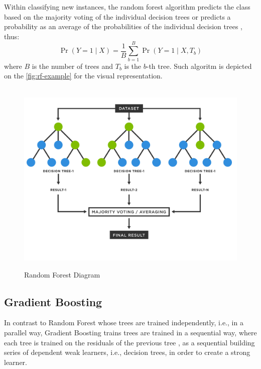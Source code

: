Within classifying new instances, the random forest algorithm predicts the class based on the majority voting of the individual decision trees or predicts a probability as an average of the probabilities of the individual decision trees \citep{randomforestmalley}, thus:
\begin{equation}
    \operatorname{Pr}\left(Y=1 \mid X \right) = \frac{1}{B} \sum_{b=1}^{B} \operatorname{Pr}\left(Y=1 \mid X, T_b \right)
\end{equation}
where $B$ is the number of trees and $T_b$ is the $b$-th tree. Such algoritm is depicted on the \autoref{fig:rf-example} for the visual representation.
\begin{figure}[H]
    \centering
    \caption{Random Forest Diagram}\vspace{0.5em}
    \label{fig:rf-example}\
    \includegraphics[width=135mm]{Figures/random-forest-diagram.jpg}

    \vspace{-1em}
\end{figure}
\subsection{Gradient Boosting}
In contrast to Random Forest whose trees are trained independently, i.e., in a parallel way, Gradient Boosting trains trees are trained in a sequential way, where each tree is trained on the residuals of the previous tree \citep{ayyadevara2018pro}, as a sequential building series of dependent weak learners, i.e., decision trees, in order to create a strong learner.

